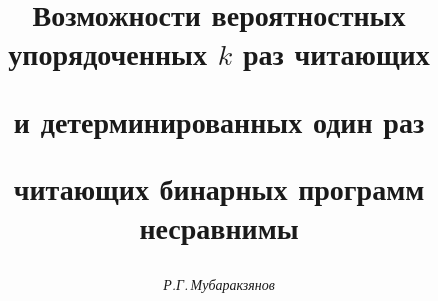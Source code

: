 









\newcommand{\const}{\operatorname{const}}


\newcommand{\tts}[1]{}










\setcounter{page}{34}















\author{\it Р.Г.\,Мубаракзянов}




\title{Возможности вероятностных упорядоченных $k$ раз читающих


и детерминированных один раз


читающих бинарных программ несравнимы}





\date{}




\pagestyle{plain} %







\maketitle


